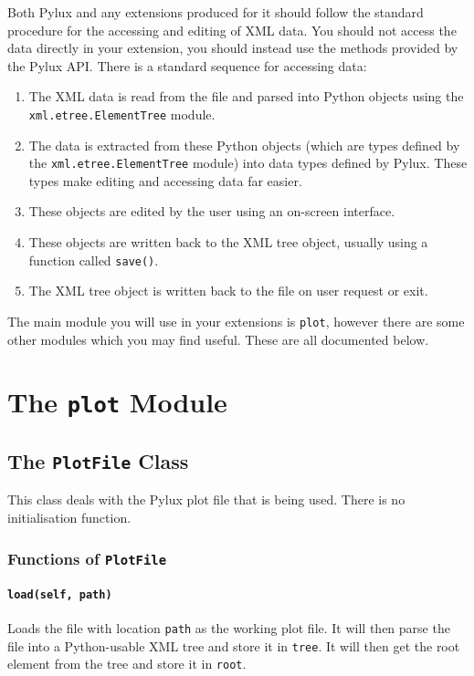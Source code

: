 \documentclass[a4paper]{article}
\begin{document}
Both Pylux and any extensions produced for it should follow the standard 
procedure for the accessing and editing of XML data. You should not access 
the data directly in your extension, you should instead use the methods 
provided by the Pylux API. There is a standard sequence for accessing data:
\begin{enumerate}
\item The XML data is read from the file and parsed into Python objects using 
the \texttt{xml.etree.ElementTree} module.
\item The data is extracted from these Python objects (which are types 
defined by the \texttt{xml.etree.ElementTree} module) into data types 
defined by Pylux. These types make editing and accessing data far easier.
\item These objects are edited by the user using an on-screen interface.
\item These objects are written back to the XML tree object, usually using a 
function called \texttt{save()}.
\item The XML tree object is written back to the file on user request or exit.
\end{enumerate}

The main module you will use in your extensions is \texttt{plot}, however 
there are some other modules which you may find useful. These are all 
documented below.

\section{The \texttt{plot} Module}

\subsection{The \texttt{PlotFile} Class}
This class deals with the Pylux plot file that is being used. There is no 
initialisation function.

\subsubsection{Functions of \texttt{PlotFile}}

\paragraph{\texttt{load(self, path)}}
Loads the file with location \texttt{path} as the working plot file. It will 
then parse the file into a Python-usable XML tree and store it in 
\texttt{tree}. It will then get the root element from the tree and store it in 
\texttt{root}.
\end{document}

